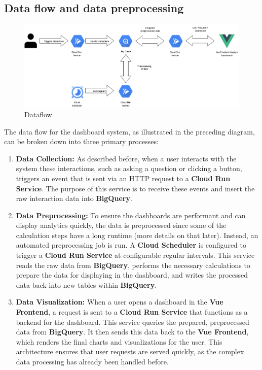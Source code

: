 \documentclass[
	english,
	ruledheaders=section,%
	class=report,%
	thesis={type=bachelor},%
	accentcolor=1b,%
	custommargins=true,%
	marginpar=false,%
	parskip=half-,%
	fontsize=11pt,%
	DIV=14,
]{tudapub}
\begin{document}
\subsection{Data flow and data preprocessing}
\begin{figure}
    \centering
    \includegraphics[width=1\linewidth]{images/DataFlow_Bachelorthesis.drawio.png}
    \caption{Dataflow}
    \label{fig:enter-label}
\end{figure}
The data flow for the dashboard system, as illustrated in the preceding diagram, can be broken down into three primary processes:

\begin{enumerate}
    \item \textbf{Data Collection:} As described before, when a user interacts with the system these interactions, such as asking a question or clicking a button, triggers an event that is sent via an HTTP request to a \textbf{Cloud Run Service}. The purpose of this service is to receive these events and insert the raw interaction data into \textbf{BigQuery}.

    \item \textbf{Data Preprocessing:} To ensure the dashboards are performant and can display analytics quickly, the data is preprocessed since some of the calculation steps have a long runtime (more details on that later). Instead, an automated preprocessing job is run. A \textbf{Cloud Scheduler} is configured to trigger a \textbf{Cloud Run Service} at configurable regular intervals. This service reads the raw data from \textbf{BigQuery}, performs the necessary calculations to prepare the data for displaying in the dashboard, and writes the processed data back into new tables within \textbf{BigQuery}.

    \item \textbf{Data Visualization:} When a user opens a dashboard in the \textbf{Vue Frontend}, a request is sent to a \textbf{Cloud Run Service} that functions as a backend for the dashboard. This service queries the prepared, preprocessed data from \textbf{BigQuery}. It then sends this data back to the \textbf{Vue Frontend}, which renders the final charts and visualizations for the user. This architecture ensures that user requests are served quickly, as the complex data processing has already been handled before.
\end{enumerate}
\end{document}
